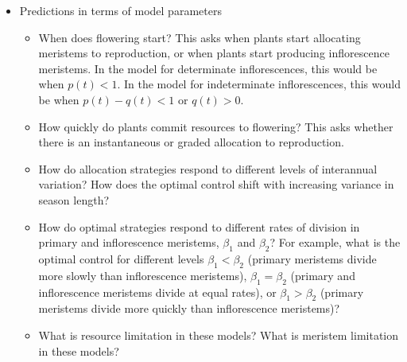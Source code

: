 \documentclass[12pt, oneside,titlepage]{article}   	%
\begin{document}
\begin{itemize}
\item Predictions in terms of model parameters

\begin{itemize}

\item When does flowering start? This asks when plants start allocating meristems to reproduction, or when plants start producing inflorescence meristems. In the model for determinate inflorescences, this would be when $ p(t) < 1 $. In the model for indeterminate inflorescences, this would be when $ p(t) - q(t) < 1 $ or $ q(t) > 0$.

\item How quickly do plants commit resources to flowering? This asks whether there is an instantaneous or graded allocation to reproduction.

\item How do allocation strategies respond to different levels of interannual variation? How does the optimal control shift with increasing variance in season length? %



\item  How do optimal strategies respond to different rates of division in primary and inflorescence meristems, $\beta_1$ and $\beta_2$? For example, what is the optimal control for different levels $\beta_1<\beta_2$ (primary meristems divide more slowly than inflorescence meristems), $\beta_1=\beta_2$ (primary and inflorescence meristems divide at equal rates), or $\beta_1>\beta_2$ (primary meristems divide more quickly than inflorescence meristems)?

\item What is resource limitation in these models? What is meristem limitation in these models? 


\end{itemize}
\end{itemize}
\end{document}
